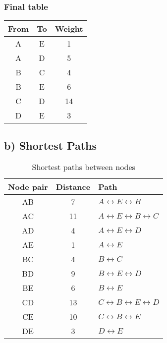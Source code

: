 \documentclass[a4paper, 11 pt, article, accentcolor=tud7b]{tudreport}
\begin{document}
	\subsubsection*{Final table}
	\begin{tabular}{| c | c | c |}
	  \hline
	  From & To & Weight \\ \hline
	  A & E & 1 \\ \hline
	  A & D & 5 \\ \hline
	  B & C & 4 \\ \hline
	  B & E & 6 \\ \hline
	  C & D & 14 \\ \hline
	  D & E & 3 \\ \hline
	\end{tabular}
	
	\subsection*{b) Shortest Paths}
	
	\begin{table}[h]
	  \centering
	  \begin{tabular}{| c | c | l |}
	    \hline
	    Node pair & Distance & Path \\ \hline
	    AB        & 7        & $A \leftrightarrow E \leftrightarrow  B$ \\ \hline
	    AC        & 11       & $A \leftrightarrow E \leftrightarrow B \leftrightarrow C$ \\ \hline
	    AD        & 4        & $A \leftrightarrow E \leftrightarrow D$ \\ \hline
	    AE        & 1        & $A \leftrightarrow E$ \\ \hline
	    BC        & 4        & $B \leftrightarrow C$ \\ \hline
	    BD        & 9        & $B \leftrightarrow E \leftrightarrow D$ \\ \hline
	    BE        & 6        & $B \leftrightarrow E$ \\ \hline
	    CD        & 13       & $C \leftrightarrow B \leftrightarrow E \leftrightarrow D$ \\ \hline
	    CE        & 10       & $C \leftrightarrow B \leftrightarrow E$\\ \hline
	    DE        & 3        & $D \leftrightarrow E$ \\ \hline
	  \end{tabular}
	  \caption{Shortest paths between nodes}
	\end{table}
	
\end{document}
